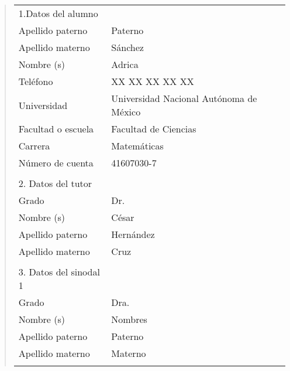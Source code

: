 {\small
\begin{quote}
\begin{tabular}{lll}
1.Datos del alumno          & {}                                          \\
Apellido paterno            & Paterno                                     \\
Apellido materno            & S\'anchez                                     \\
Nombre (s)                   & Adrica                                     \\
Tel\'efono                  & XX XX XX XX XX                              \\
Universidad                 & Universidad Nacional Aut\'onoma de M\'exico \\
Facultad o escuela          & Facultad de Ciencias                        \\
Carrera                     & Matem\'aticas                                     \\
N\'umero de cuenta          & 41607030-7                                   \\
{}                          & {}                                          \\
2. Datos del tutor          & {}                                          \\
Grado                       & Dr.                                         \\
Nombre (s)                   & C\'esar                                     \\
Apellido paterno            & Hern\'andez                                 \\
Apellido materno            & Cruz                                        \\
{}                          & {}                                          \\
3. Datos del sinodal 1      & {}                                          \\
Grado                       & Dra.                                        \\
Nombre (s)                   & Nombres                                     \\
Apellido paterno            & Paterno                                     \\
Apellido materno            & Materno                                     \\
{}                          & {}                                          \\

\end{tabular}
\end{quote}}
